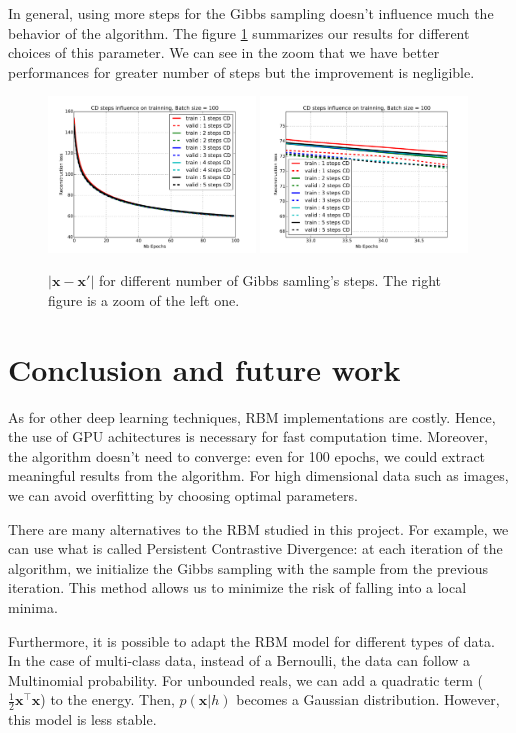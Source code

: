 \documentclass{article}
\begin{document}
In general, using more steps for the Gibbs sampling doesn't influence much the behavior of the algorithm. The figure \ref{CD} summarizes our results for different choices of this parameter. We can see in the zoom that we have better performances for greater number of steps but the improvement is negligible.

\begin{figure}
\centering
\includegraphics[width=0.49\textwidth]{CD}
\includegraphics[width=0.49\textwidth]{CD_zoom}
\caption{$\lvert \mathbf{x} - \mathbf{x'} \rvert$ for different number of Gibbs samling's steps. The right figure is a zoom of the left one.}
\label{CD}
\end{figure}



\clearpage
\section{Conclusion and future work}

As for other deep learning techniques, RBM implementations are costly. Hence, the use of GPU achitectures is necessary for fast computation time. Moreover, the algorithm doesn't need to converge: even for 100 epochs, we could extract meaningful results from the algorithm. For high dimensional data such as images, we can avoid overfitting by choosing optimal parameters.

There are many alternatives to the RBM studied in this project. For example, we can use what is called Persistent Contrastive Divergence: at each iteration of the algorithm, we initialize the Gibbs sampling with the sample from the previous iteration. This method allows us to minimize the risk of falling into a local minima.

Furthermore, it is possible to adapt the RBM model for different types of data. In the case of multi-class data, instead of a Bernoulli, the data can follow a Multinomial probability. For unbounded reals, we can add a quadratic term ($\frac{1}{2}\mathbf{x}^\top \mathbf{x}$) to the energy. Then, $p(\mathbf{x}|h)$ becomes a Gaussian distribution. However, this model is less stable.


\clearpage
\nocite{*}


\end{document}
